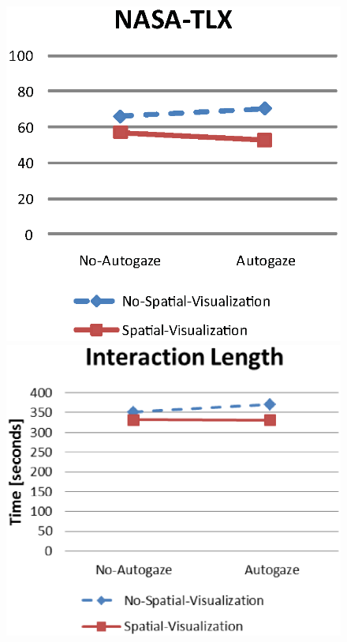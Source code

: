 \documentclass[journal]{IEEEtran}
\begin{document}
\begin{figure}[t]
\centering
\includegraphics[keepaspectratio, scale= 0.5]{figs/nasaTlxFinal.eps}
\includegraphics[keepaspectratio, scale= 0.33]{figs/interactionLengthFinal1.eps}

\end{figure}
\end{document}

